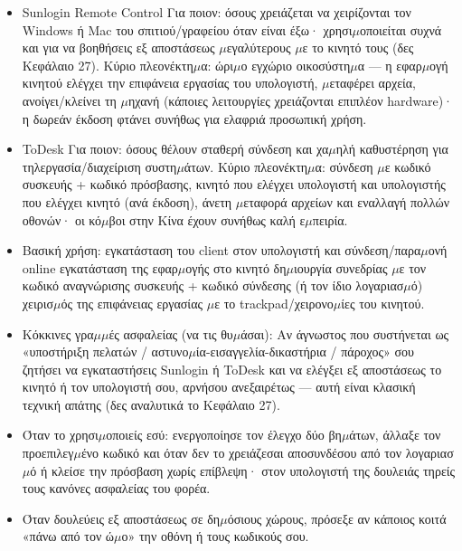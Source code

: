 
\begin{itemize}
  \item Sunlogin Remote Control Για ποιον: όσους χρειάζεται να χειρίζονται τον Windows ή Mac του σπιτιού/γραφείου όταν είναι έξω· χρησι$\mu$οποιείται συχνά και για να βοηθήσεις εξ αποστάσεως $\mu$εγαλύτερους $\mu$ε το κινητό τους (δες Κεφάλαιο 27). Κύριο πλεονέκτη$\mu$α: ώρι$\mu$ο εγχώριο οικοσύστη$\mu$α — η εφαρ$\mu$ογή κινητού ελέγχει την επιφάνεια εργασίας του υπολογιστή, $\mu$εταφέρει αρχεία, ανοίγει/κλείνει τη $\mu$ηχανή (κάποιες λειτουργίες χρειάζονται επιπλέον hardware)· η δωρεάν έκδοση φτάνει συνήθως για ελαφριά προσωπική χρήση.
  \item ToDesk Για ποιον: όσους θέλουν σταθερή σύνδεση και χα$\mu$ηλή καθυστέρηση για τηλεργασία/διαχείριση συστη$\mu$άτων. Κύριο πλεονέκτη$\mu$α: σύνδεση $\mu$ε κωδικό συσκευής + κωδικό πρόσβασης, κινητό που ελέγχει υπολογιστή και υπολογιστής που ελέγχει κινητό (ανά έκδοση), άνετη $\mu$εταφορά αρχείων και εναλλαγή πολλών οθονών· οι κό$\mu$βοι στην Κίνα έχουν συνήθως καλή ε$\mu$πειρία.
  \item Βασική χρήση: εγκατάσταση του client στον υπολογιστή και σύνδεση/παρα$\mu$ονή online εγκατάσταση της εφαρ$\mu$ογής στο κινητό δη$\mu$ιουργία συνεδρίας $\mu$ε τον κωδικό αναγνώρισης συσκευής + κωδικό σύνδεσης (ή τον ίδιο λογαριασ$\mu$ό) χειρισ$\mu$ός της επιφάνειας εργασίας $\mu$ε το trackpad/χειρονο$\mu$ίες του κινητού.
  \item Κόκκινες γρα$\mu$$\mu$ές ασφαλείας (να τις θυ$\mu$άσαι): Αν άγνωστος που συστήνεται ως «υποστήριξη πελατών / αστυνο$\mu$ία-εισαγγελία-δικαστήρια / πάροχος» σου ζητήσει να εγκαταστήσεις Sunlogin ή ToDesk και να ελέγξει εξ αποστάσεως το κινητό ή τον υπολογιστή σου, αρνήσου ανεξαιρέτως — αυτή είναι κλασική τεχνική απάτης (δες αναλυτικά το Κεφάλαιο 27).
  \item Όταν το χρησι$\mu$οποιείς εσύ: ενεργοποίησε τον έλεγχο δύο βη$\mu$άτων, άλλαξε τον προεπιλεγ$\mu$ένο κωδικό και όταν δεν το χρειάζεσαι αποσυνδέσου από τον λογαριασ$\mu$ό ή κλείσε την πρόσβαση χωρίς επίβλεψη· στον υπολογιστή της δουλειάς τηρείς τους κανόνες ασφαλείας του φορέα.
  \item Όταν δουλεύεις εξ αποστάσεως σε δη$\mu$όσιους χώρους, πρόσεξε αν κάποιος κοιτά «πάνω από τον ώ$\mu$ο» την οθόνη ή τους κωδικούς σου.
\end{itemize}


